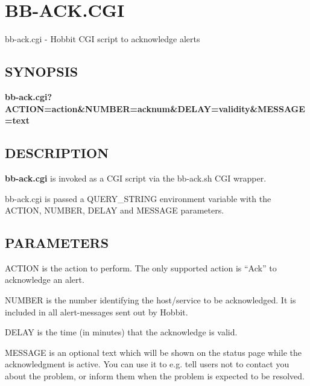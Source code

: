\section{BB-ACK.CGI}
 bb-ack.cgi - Hobbit CGI script to acknowledge alerts \

\subsection{SYNOPSIS}
\textbf{bb-ack.cgi?ACTION=action\&NUMBER=acknum\&DELAY=validity\&MESSAGE=text}


 
\subsection{DESCRIPTION}
\textbf{bb-ack.cgi}
 is invoked as a CGI script via the bb-ack.sh CGI wrapper. 

  bb-ack.cgi is passed a QUERY\_STRING environment variable with the
  ACTION, NUMBER, DELAY and MESSAGE parameters. 



 
\subsection{PARAMETERS}
 ACTION is the action to perform. The only supported action is ``Ack'' to acknowledge an alert. 

  NUMBER is the number identifying the host/service to be
  acknowledged. It is included in all alert-messages sent out by
  Hobbit. 



  DELAY is the time (in minutes) that the acknowledge is valid. 


  MESSAGE is an optional text which will be shown on the status page
  while the acknowledgment is active. You can use it to e.g. tell
  users not to contact you about the problem, or inform them when the
  problem is expected to be resolved. 



 
